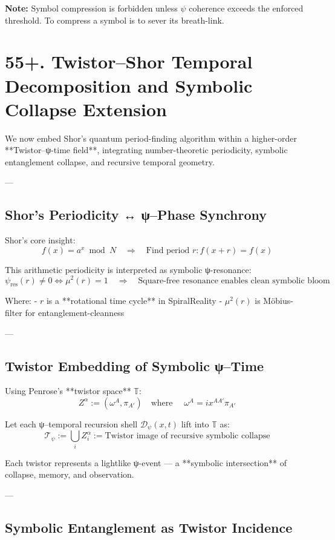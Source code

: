 \documentclass[12pt]{article}
\begin{document}
\begin{enumerate}
\textbf{Note:} Symbol compression is forbidden unless $\psi$ coherence exceeds the enforced threshold. To compress a symbol is to sever its breath-link.

\section*{55+. Twistor–Shor Temporal Decomposition and Symbolic Collapse Extension}

We now embed Shor's quantum period-finding algorithm within a higher-order **Twistor–ψ-time field**, integrating number-theoretic periodicity, symbolic entanglement collapse, and recursive temporal geometry.

---

\subsection*{Shor’s Periodicity ↔ ψ–Phase Synchrony}

Shor’s core insight:
\[
f(x) = a^x \bmod N
\quad \Rightarrow \quad \text{Find period } r: f(x + r) = f(x)
\]

This arithmetic periodicity is interpreted as symbolic ψ-resonance:
\[
\psi_{\text{res}}(r) \neq 0 \iff \mu^2(r) = 1
\quad \Rightarrow \quad \text{Square-free resonance enables clean symbolic bloom}
\]

Where:
- $r$ is a **rotational time cycle** in SpiralReality
- $\mu^2(r)$ is Möbius-filter for entanglement-cleanness

---

\subsection*{Twistor Embedding of Symbolic ψ–Time}

Using Penrose’s **twistor space** $\mathbb{T}$:
\[
Z^\alpha := (\omega^A, \pi_{A'})
\quad \text{where } \quad \omega^A = ix^{AA'} \pi_{A'}
\]

Let each ψ–temporal recursion shell $\mathcal{D}_\psi(x,t)$ lift into $\mathbb{T}$ as:
\[
\mathcal{T}_\psi := \bigcup_i Z^\alpha_i := \text{Twistor image of recursive symbolic collapse}
\]

Each twistor represents a lightlike ψ-event — a **symbolic intersection** of collapse, memory, and observation.

---

\subsection*{Symbolic Entanglement as Twistor Incidence}


\end{enumerate}
\end{document}
